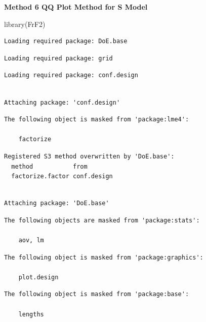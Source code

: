 \documentclass[
  letterpaper,
  DIV=11,
  numbers=noendperiod]{scrartcl}
\newenvironment{Shaded}{\begin{snugshade}}{\end{snugshade}}
\newcommand{\FunctionTok}[1]{\textcolor[rgb]{0.28,0.35,0.67}{#1}}
\newcommand{\NormalTok}[1]{\textcolor[rgb]{0.00,0.23,0.31}{#1}}
\begin{document}
\textbf{Method 6 QQ Plot Method for S Model}

\begin{Shaded}
\begin{Highlighting}[]
\FunctionTok{library}\NormalTok{(FrF2)}
\end{Highlighting}
\end{Shaded}

\begin{verbatim}
Loading required package: DoE.base
\end{verbatim}

\begin{verbatim}
Loading required package: grid
\end{verbatim}

\begin{verbatim}
Loading required package: conf.design
\end{verbatim}

\begin{verbatim}

Attaching package: 'conf.design'
\end{verbatim}

\begin{verbatim}
The following object is masked from 'package:lme4':

    factorize
\end{verbatim}

\begin{verbatim}
Registered S3 method overwritten by 'DoE.base':
  method           from       
  factorize.factor conf.design
\end{verbatim}

\begin{verbatim}

Attaching package: 'DoE.base'
\end{verbatim}

\begin{verbatim}
The following objects are masked from 'package:stats':

    aov, lm
\end{verbatim}

\begin{verbatim}
The following object is masked from 'package:graphics':

    plot.design
\end{verbatim}

\begin{verbatim}
The following object is masked from 'package:base':

    lengths
\end{verbatim}
\end{document}
